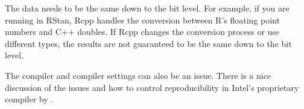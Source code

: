 The data needs to be the same down to the bit level. For example, if
you are running in RStan, Rcpp handles the conversion between R's
floating point numbers and C++ doubles. If Rcpp changes the conversion
process or use different types, the results are not guaranteed to be
the same down to the bit level.  

The compiler and compiler settings can also be an issue.  There is a
nice discussion of the issues and how to control reproducibility in
Intel's proprietary compiler by \cite{CordenKreitzer:2014}.
